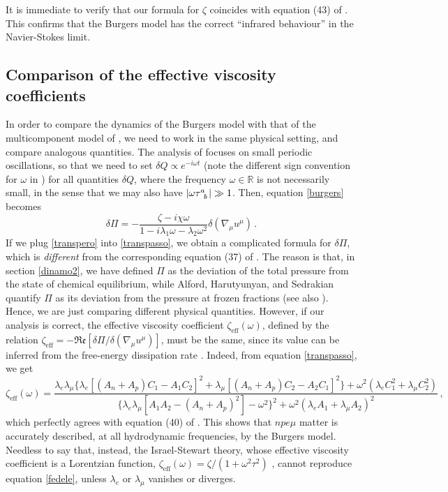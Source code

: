 \documentclass[a4paper, amsfonts, amssymb, amsmath, reprint, showkeys, nofootinbib, twoside, onecolumn,notitlepage]{revtex4-1}
\begin{document}
It is immediate to verify that our formula for $\zeta$ coincides with equation (43) of \cite{AlfordMuons2022}. This  confirms that the Burgers model has the correct ``infrared behaviour'' in the Navier-Stokes limit.

\subsection{Comparison of the effective viscosity coefficients}

In order to compare the dynamics of the Burgers model with that of the multicomponent model of \cite{AlfordMuons2021,AlfordMuons2022}, we need to work in the same physical setting, and compare analogous quantities. The analysis of \cite{AlfordMuons2021,AlfordMuons2022} focuses on small periodic oscillations, so that we need to set $\delta Q \propto e^{-i\omega t}$ (note the different sign convention for $\omega$ in \cite{AlfordMuons2021,AlfordMuons2022}) for all quantities $\delta Q$, where the frequency $\omega \in \mathbb{R}$ is not necessarily small, in the sense that we may also have $|\omega\tau\indices{^a _b}| \gg 1$. Then, equation \eqref{burgers} becomes
\begin{equation}\label{transpasso}
\delta \Pi = - \dfrac{\zeta - i\chi \omega}{1-i\lambda_1\omega -\lambda_2 \omega^2 } \delta(\nabla_\mu u^\mu) \, .
\end{equation} 
If we plug \eqref{transpero} into \eqref{transpasso}, we obtain a complicated formula for $\delta \Pi$, which is \textit{different} from the corresponding equation (37) of \cite{AlfordMuons2022}. The reason is that, in section \ref{dinamo2}, we have defined $\Pi$ as the deviation of the total pressure from the state of chemical equilibrium, while Alford, Harutyunyan, and Sedrakian quantify $\Pi$ as its deviation from the pressure at frozen fractions (see also \cite{AlfordFirst2020}). Hence, we are just comparing different physical quantities. However, if our analysis is correct, the effective viscosity coefficient $\zeta_{\text{eff}}(\omega)$, defined by the relation $\zeta_{\text{eff}} = -\mathfrak{Re} [\delta \Pi/  \delta (\nabla_\mu u^\mu)]$, must be the same, since its value can be inferred from the free-energy dissipation rate \cite{BaggioliHolography,Sawyer_Bulk1989,BulkGavassino}. Indeed, from equation \eqref{transpasso}, we get 
\begin{equation}\label{fedele}
\zeta_{\text{eff}}(\omega)= \dfrac{\lambda_e \lambda_\mu \big\{\lambda_e [(A_n+A_p)C_1-A_1 C_2]^2+\lambda_\mu[(A_n+A_p)C_2-A_2 C_1]^2 \big\}+\omega^2 (\lambda_e C_1^2+\lambda_\mu C_2^2) }{\big\{ \lambda_e \lambda_\mu [A_1A_2-(A_n +A_p)^2]-\omega^2 \big\}^2 +\omega^2(\lambda_e A_1+\lambda_\mu A_2)^2} \, ,
\end{equation}
which perfectly agrees with equation (40) of \cite{AlfordMuons2022}. This shows that $npe\mu$ matter is accurately described, at all hydrodynamic frequencies, by the Burgers model. Needless to say that, instead, the Israel-Stewart theory, whose effective viscosity coefficient is a Lorentzian function, $\zeta_{\text{eff}}(\omega)=\zeta/(1+\omega^2 \tau^2)$ \cite{BulkGavassino}, cannot reproduce equation \eqref{fedele}, unless $\lambda_e$ or $\lambda_\mu$ vanishes or diverges.  
\end{document}
